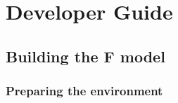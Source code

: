 \chapter{Developer Guide}


\section{Building the F model}



\subsection{Preparing the environment}

